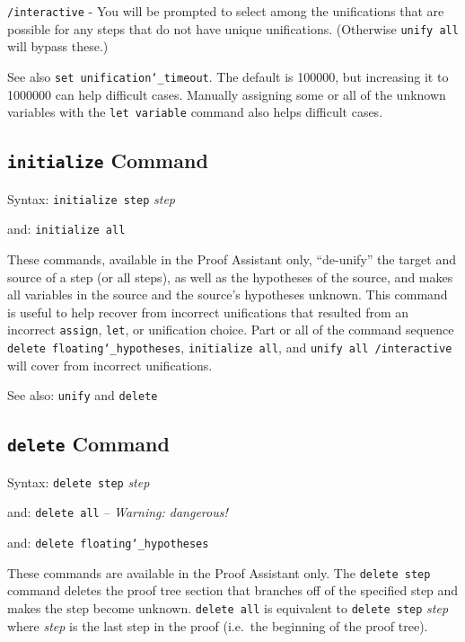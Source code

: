     \texttt{/interactive} - You will be prompted to select among the
        unifications
        that are possible for any steps that do not have unique
        unifications.  (Otherwise \texttt{unify all} will bypass these.)

See also \texttt{set unification{\char`\_}timeout}.  The default is
100000, but increasing it to 1000000 can help difficult cases.  Manually
assigning some or all of the unknown variables with the \texttt{let
variable} command also helps difficult cases.



\subsection{\texttt{initialize} Command}
Syntax:  \texttt{initialize step} {\em step}

    and: \texttt{initialize all}

These commands, available in the Proof Assistant
only, ``de-unify'' the target and source of a step (or all steps), as
well as the hypotheses of the source, and makes all variables in the
source and the source's hypotheses unknown.  This command is useful to
help recover from incorrect unifications that resulted from an incorrect
\texttt{assign}, \texttt{let}, or unification choice.  Part or all of
the command sequence \texttt{delete floating{\char`\_}hypotheses},
\texttt{initialize all}, and \texttt{unify all /interactive} will cover
from incorrect unifications.

See also:  \texttt{unify} and \texttt{delete}



\subsection{\texttt{delete} Command}
Syntax:  \texttt{delete step} {\em step}

   and:      \texttt{delete all} -- {\em Warning: dangerous!}

   and:      \texttt{delete floating{\char`\_}hypotheses}

These commands are available in the Proof Assistant only.  The
\texttt{delete step} command deletes the proof tree section that
branches off of the specified step and makes the step become unknown.
\texttt{delete all} is equivalent to \texttt{delete step} {\em step}
where {\em step} is the last step in the proof (i.e.\ the beginning of
the proof tree).


